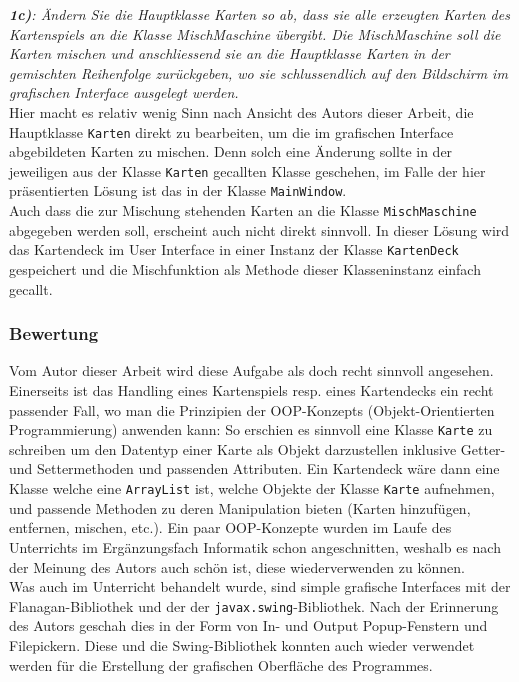 \documentclass[a4paper,11pt]{article}
\begin{document}
\textit{\textbf{1c)}: Ändern Sie die Hauptklasse Karten so ab, dass sie alle erzeugten Karten des Kartenspiels an die Klasse MischMaschine übergibt. Die MischMaschine soll die Karten mischen und
anschliessend sie an die Hauptklasse Karten in der gemischten Reihenfolge zurückgeben, wo sie schlussendlich auf den Bildschirm im grafischen Interface ausgelegt werden.}\\

Hier macht es relativ wenig Sinn nach Ansicht des Autors dieser Arbeit, die Hauptklasse \texttt{Karten} direkt zu bearbeiten, um die im grafischen Interface abgebildeten Karten zu mischen. Denn solch eine Änderung sollte in der jeweiligen aus der Klasse \texttt{Karten} gecallten Klasse geschehen, im Falle der hier präsentierten Lösung ist das in der Klasse \texttt{MainWindow}.\\

Auch dass die zur Mischung stehenden Karten an die Klasse \texttt{MischMaschine} abgegeben werden soll, erscheint auch nicht direkt sinnvoll. In dieser Lösung wird das Kartendeck im User Interface in einer Instanz der Klasse \texttt{KartenDeck} gespeichert und die Mischfunktion als Methode dieser Klasseninstanz einfach gecallt.



\subsubsection{Bewertung}
Vom Autor dieser Arbeit wird diese Aufgabe als doch recht sinnvoll angesehen. Einerseits ist das Handling eines Kartenspiels resp. eines Kartendecks ein recht passender Fall, wo man die Prinzipien der OOP-Konzepts (Objekt-Orientierten Programmierung) anwenden kann: So erschien es sinnvoll eine Klasse \texttt{Karte} zu schreiben um den Datentyp einer Karte als Objekt darzustellen inklusive Getter- und Settermethoden und passenden Attributen. Ein Kartendeck wäre dann eine Klasse welche eine \texttt{ArrayList} ist, welche Objekte der Klasse \texttt{Karte} aufnehmen, und passende Methoden zu deren Manipulation bieten (Karten hinzufügen, entfernen, mischen, etc.). Ein paar OOP-Konzepte wurden im Laufe des Unterrichts im Ergänzungsfach Informatik schon angeschnitten, weshalb es nach der Meinung des Autors auch schön ist, diese wiederverwenden zu können. \\

Was auch im Unterricht behandelt wurde, sind simple grafische Interfaces mit der Flanagan-Bibliothek und der der \texttt{javax.swing}-Bibliothek. Nach der Erinnerung des Autors geschah dies in der Form von In- und Output Popup-Fenstern und Filepickern. Diese und die Swing-Bibliothek konnten auch wieder verwendet werden für die Erstellung der grafischen Oberfläche des Programmes.\\
\end{document}
